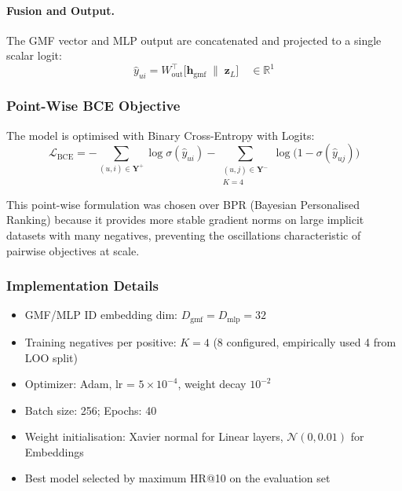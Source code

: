 \documentclass[11pt,a4paper]{article}
\begin{document}
\paragraph{Fusion and Output.}
The GMF vector and MLP output are concatenated and projected to a single scalar logit:
\begin{equation}
  \hat{y}_{ui} = W_{\text{out}}^\top \bigl[\mathbf{h}_{\text{gmf}} \;\|\; \mathbf{z}_L\bigr] \quad \in \mathbb{R}^1
\end{equation}

\subsubsection{Point-Wise BCE Objective}
The model is optimised with Binary Cross-Entropy with Logits:
\begin{equation}
  \mathcal{L}_{\text{BCE}} = -\sum_{(u,i)\in\mathbf{Y}^+} \log\sigma(\hat{y}_{ui}) - \sum_{\substack{(u,j)\in\mathbf{Y}^- \\ K=4}} \log\bigl(1-\sigma(\hat{y}_{uj})\bigr)
\end{equation}

This point-wise formulation was chosen over BPR (Bayesian Personalised Ranking) because it provides more stable gradient norms on large implicit datasets with many negatives, preventing the oscillations characteristic of pairwise objectives at scale.

\subsubsection{Implementation Details}
\begin{itemize}[leftmargin=1.5em, noitemsep]
  \item GMF/MLP ID embedding dim: $D_{\text{gmf}} = D_{\text{mlp}} = 32$
  \item Training negatives per positive: $K = 4$ (8 configured, empirically used 4 from LOO split)
  \item Optimizer: Adam, lr = $5\times10^{-4}$, weight decay $10^{-2}$
  \item Batch size: 256; Epochs: 40
  \item Weight initialisation: Xavier normal for Linear layers, $\mathcal{N}(0, 0.01)$ for Embeddings
  \item Best model selected by maximum HR@10 on the evaluation set

\end{itemize}

\end{document}
